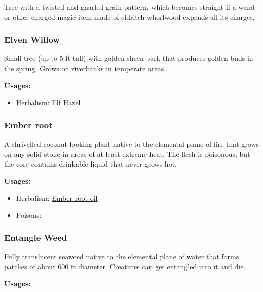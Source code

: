 Tree with a twisted and gnarled grain pattern, which becomes straight if a wand or other charged magic item made of eldritch whorlwood expends all its charges.

\subsubsection{Elven Willow}
\label{Elven Willow}

Small tree (up to 5 ft tall) with golden-sheen bark that produces golden buds in the spring. Grows on riverbanks in temperate areas.

\vspace{5mm}

\textbf{Usages:}

\begin{itemize}[noitemsep]
\item[] Herbalism: \hyperref[Elf Hazel]{Elf Hazel}
\end{itemize}

\subsubsection{Ember root}
\label{Ember root}

A shrivelled-coconut looking plant native to the elemental plane of fire that grows on any solid stone in areas of at least extreme heat. The flesh is poisonous, but the core contains drinkable liquid that never grows hot.

\vspace{5mm}

\textbf{Usages:}

\begin{itemize}[noitemsep]
\item[] Herbalism: \hyperref[Ember root oil]{Ember root oil}
\item[] Poisons: \poison
\end{itemize}

\subsubsection{Entangle Weed}
\label{Entangle Weed}

Fully translucent seaweed native to the elemental plane of water that forms patches of about 600 ft diameter. Creatures can get entangled into it and die.

\vspace{5mm}

\textbf{Usages:}

